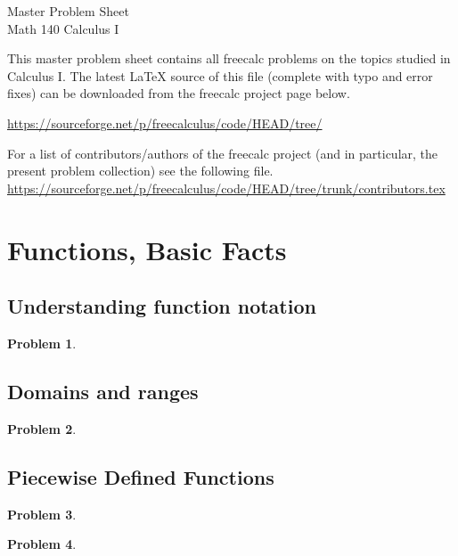 \documentclass{article}
\newtheorem{problem}{Problem}
\begin{document}
\begin{center}
\Large
Master Problem Sheet \\ Math 140 Calculus I \\ 
\end{center}





This master problem sheet contains all freecalc problems on the topics studied in Calculus I. The latest \LaTeX{} source of this file (complete with typo and error fixes) can be downloaded from the freecalc project page below. 

\url{https://sourceforge.net/p/freecalculus/code/HEAD/tree/}

For a list of contributors/authors of the freecalc project (and in particular, the present problem collection) see the following file.
\url{https://sourceforge.net/p/freecalculus/code/HEAD/tree/trunk/contributors.tex}

\section{Functions, Basic Facts}
\subsection{Understanding function notation}
\begin{problem}

\end{problem}
\subsection{Domains and ranges}
\begin{problem}

\end{problem}
\subsection{Piecewise Defined Functions}
\begin{problem}

\end{problem}
\begin{problem}

\end{problem}
\end{document}
